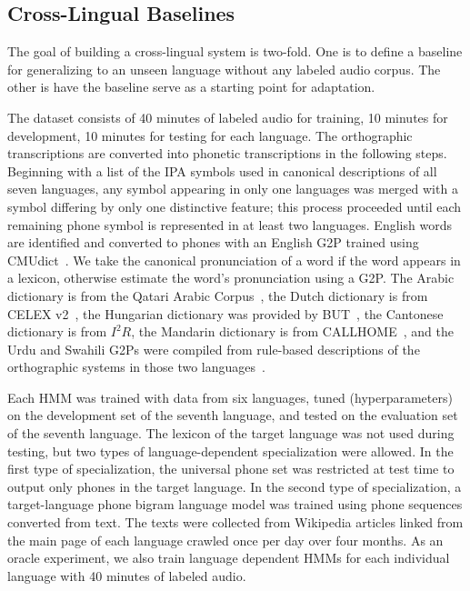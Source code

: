 \subsection{Cross-Lingual Baselines}
\label{sec:mlbaseline}

The goal of building a cross-lingual system is two-fold.
One is to define a baseline for generalizing to an unseen
language without any labeled audio corpus.  The other
is have the baseline serve as a starting point for
adaptation.

The dataset consists of 40 minutes of labeled audio for training,
10 minutes for development, 10 minutes for testing
for each language.
The orthographic transcriptions are converted into
phonetic transcriptions in the following steps.
Beginning with a list of the IPA symbols used in canonical descriptions
of all seven languages,
any symbol appearing in only one languages was merged with a symbol
differing by only one distinctive feature; this process proceeded until 
each remaining phone symbol is represented in at least two languages.
English words are identified and converted to phones with
an English G2P trained using CMUdict~\cite{Lenzo1995}.
We take the canonical pronunciation of a word if the word
appears in a lexicon,
otherwise estimate the word's pronunciation using a G2P.
The Arabic dictionary is from the Qatari Arabic Corpus~\cite{Elmahdy14},
the Dutch dictionary is from CELEX v2~\cite{Baayen96},
the Hungarian dictionary was provided by BUT~\cite{Grezl14},
the Cantonese dictionary is from $I^2R$,
the Mandarin dictionary is from CALLHOME~\cite{Canavan96},
and the Urdu and Swahili G2Ps were compiled from
rule-based descriptions of the orthographic systems in those
two languages~\cite{Hasegawajohnson15}.

Each HMM was trained with data from six languages, tuned
(hyperparameters) on the development set of the seventh language, and
tested on the evaluation set of the seventh language.  The lexicon of
the target language was not used during testing, but two types of
language-dependent specialization were allowed.  In the first type of
specialization, the universal phone set was restricted at test time to
output only phones in the target language.  In the second type of
specialization, a target-language phone bigram language model was
trained using phone sequences converted from text.  The texts were
collected from Wikipedia articles linked from the main page of each
language crawled once per day over four months.
As an oracle experiment, we also train language dependent
HMMs for each individual language with 40 minutes of labeled audio.


